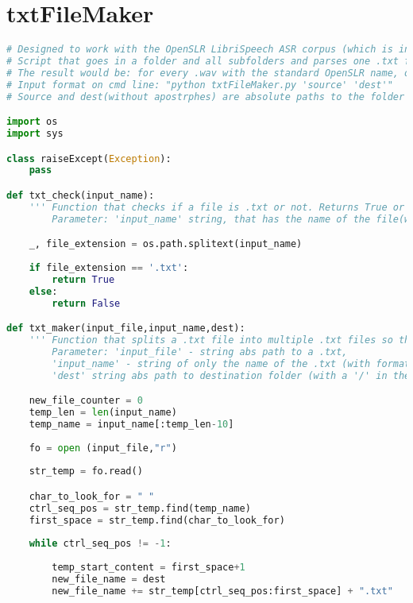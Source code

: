 \section{txtFileMaker}
\begin{lstlisting}[language=Python, caption=txtFileMaker code.]
# Designed to work with the OpenSLR LibriSpeech ASR corpus (which is in .flac)
# Script that goes in a folder and all subfolders and parses one .txt file containg paragraphs to multiple .txt files corresponding to their .wav files
# The result would be: for every .wav with the standard OpenSLR name, one .txt file with the same name as the .wav (audio corresponds to the paragraph)
# Input format on cmd line: "python txtFileMaker.py 'source' 'dest'"         
# Source and dest(without apostrphes) are absolute paths to the folder containing the unsplit .txt files and the folder where the converted .flac to .wav files are respecively 

import os
import sys

class raiseExcept(Exception):
    pass

def txt_check(input_name):
    ''' Function that checks if a file is .txt or not. Returns True or False (bool)
        Parameter: 'input_name' string, that has the name of the file(with format). It may work with absolute path and name (maybe) '''    

    _, file_extension = os.path.splitext(input_name)
        
    if file_extension == '.txt':   
        return True
    else:
        return False

def txt_maker(input_file,input_name,dest):
    ''' Function that splits a .txt file into multiple .txt files so that the .wav files and .txt files are 1 to 1 pairs. 
        Parameter: 'input_file' - string abs path to a .txt, 
        'input_name' - string of only the name of the .txt (with format), 
        'dest' string abs path to destination folder (with a '/' in the end!) '''    

    new_file_counter = 0
    temp_len = len(input_name)
    temp_name = input_name[:temp_len-10]
    
    fo = open (input_file,"r")
    
    str_temp = fo.read()

    char_to_look_for = " "
    ctrl_seq_pos = str_temp.find(temp_name)
    first_space = str_temp.find(char_to_look_for)
        
    while ctrl_seq_pos != -1:
        
        temp_start_content = first_space+1
        new_file_name = dest
        new_file_name += str_temp[ctrl_seq_pos:first_space] + ".txt"     
        

\end{lstlisting}
